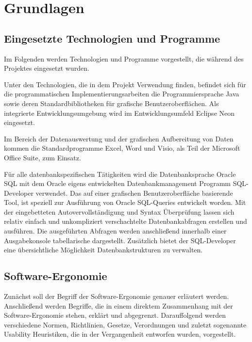 \section{Grundlagen}


\subsection{Eingesetzte Technologien und Programme}
Im Folgenden werden Technologien und Programme vorgestellt, die während des Projektes eingesetzt wurden.

Unter den Technologien, die in dem Projekt Verwendung finden, befindet sich für die programmatischen Implementierungsarbeiten die Programmiersprache Java sowie deren Standardbibliotheken für grafische Benutzeroberflächen. Als integrierte Entwicklungsumgebung wird im Entwicklungsumfeld Eclipse Neon eingesetzt. 

Im Bereich der Datenauswertung und der grafischen Aufbereitung von Daten kommen die Standardprogramme Excel, Word und Visio, als Teil der Microsoft Office Suite, zum Einsatz. 

Für alle datenbankspezifischen Tätigkeiten wird die Datenbanksprache Oracle SQL mit dem Oracle eigens entwickelten Datenbankmanagement Programm SQL-Developer verwendet. Das auf einer grafischen Benutzeroberfläche basierende Tool, ist speziell zur Ausführung von Oracle SQL-Queries entwickelt worden. Mit der eingebetteten Autovervollständigung und Syntax Überprüfung lassen sich relativ einfach und unkompliziert verschachtelte Datenbankabfragen erstellen und ausführen. Die ausgeführten Abfragen werden anschließend innerhalb einer Ausgabekonsole tabellarische dargestellt. Zusätzlich bietet der SQL-Developer eine übersichtliche Möglichkeit Datenbankstrukturen zu verwalten. 


\subsection{Software-Ergonomie}
Zunächst soll der Begriff der Software-Ergonomie genauer erläutert werden. Anschließend werden Begriffe, die in einem direktem Zusammenhang mit der Software-Ergonomie stehen, erklärt und abgegrenzt. Darauffolgend werden verschiedene Normen, Richtlinien, Gesetze, Verordnungen und zuletzt sogenannte Usability Heuristiken, die in der Vergangenheit entworfen wurden, vorgestellt.

